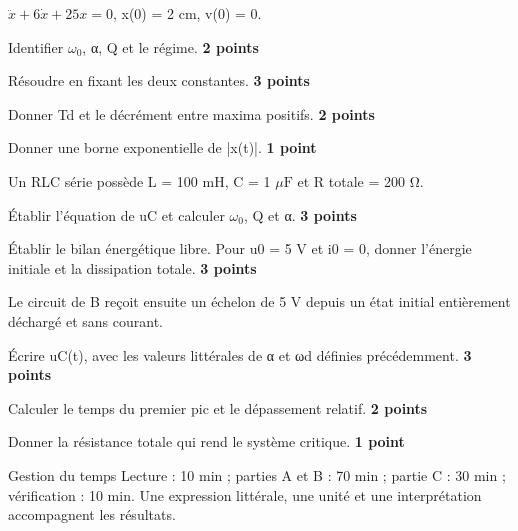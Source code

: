 $\ddot x+6\dot x+25x=0$, x(0) = 2 cm, v(0) = 0.
\begin{questions}
\item Identifier $\omega_0$, α, Q et le régime. \textbf{2 points}
\item Résoudre en fixant les deux constantes. \textbf{3 points}
\item Donner Td et le décrément entre maxima positifs. \textbf{2 points}
\item Donner une borne exponentielle de |x(t)|. \textbf{1 point}
\end{questions}
Un RLC série possède L = 100 mH, C = 1 $\mu\mathrm{ F}$ et R totale = 200 Ω.
\begin{questions}
\item Établir l’équation de uC et calculer $\omega_0$, Q et α. \textbf{3 points}
\item Établir le bilan énergétique libre. Pour u0 = 5 V et i0 = 0, donner l’énergie initiale et la dissipation totale. \textbf{3 points}
\end{questions}


Le circuit de B reçoit ensuite un échelon de 5 V depuis un état initial entièrement déchargé et sans courant.
\begin{questions}
\item Écrire uC(t), avec les valeurs littérales de α et ωd définies précédemment. \textbf{3 points}
\item Calculer le temps du premier pic et le dépassement relatif. \textbf{2 points}
\item Donner la résistance totale qui rend le système critique. \textbf{1 point}
\end{questions}
\begin{docu}{Gestion du temps}
Lecture : 10 min ; parties A et B : 70 min ; partie C : 30 min ; vérification : 10 min. Une expression littérale, une unité et une interprétation accompagnent les résultats.
\end{docu}


